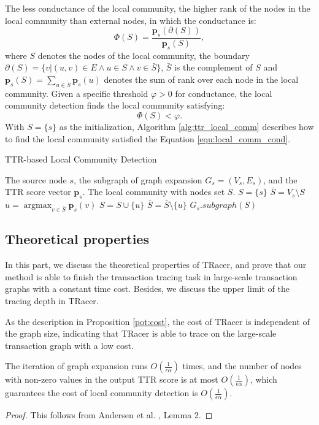 The less conductance \cite{andersen2006local, andersen2007local} of the local community, the higher rank of the nodes in the local community than external nodes, in which the conductance is:
\begin{equation}
    \Phi(S)=\frac{\bm{p}_s(\partial(S))}{\bm{p}_s(S)},
\end{equation}
where $S$ denotes the nodes of the local community, the boundary $\partial(S)=\{ v| (u,v) \in E \land u \in S \land v \in \bar{S} \}$, $\bar{S}$ is the complement of $S$ and $\bm{p}_s(S)=\sum_{u \in S}\bm{p}_s(u)$ denotes the sum of rank over each node in the local community.
Given a specific threshold $\varphi > 0$ for conductance, the local community detection finds the local community satisfying:
\begin{equation}
    \Phi(S) < \varphi.
    \label{equ:local_comm_cond}
\end{equation}
With $S=\{s\}$ as the initialization, Algorithm \ref{alg:ttr_local_comm} describes how to find the local community satisfied the Equation \ref{equ:local_comm_cond}.
\begin{algorithm}[t]
    \caption{TTR-based Local Community Detection}
    \label{alg:ttr_local_comm}
    \begin{algorithmic}[1]
        \REQUIRE The source node $s$, the subgraph of graph expansion $G_s=(V_s, E_s)$, and the TTR score vector $\bm{p}_s$.
        \ENSURE The local community with nodes set $S$.
        \STATE $S = \{ s \}$
        \STATE $\bar{S} = V_s \setminus S$
            \STATE $u =\mathop{\arg\max}_{v\in\bar{S}}\bm{p}_s(v)$
            \STATE $S = S \cup \{ u \}$
            \STATE $\bar{S} = \bar{S} \setminus \{ u \}$
        \ENDWHILE
        \RETURN $G_s.subgraph(S)$
    \end{algorithmic}
\end{algorithm}
\subsection{Theoretical properties}
In this part, we discuss the theoretical properties of TRacer, and prove that our method is able to finish the transaction tracing task in large-scale transaction graphs with a constant time cost. Besides, we discuss the upper limit of the tracing depth in TRacer.

As the description in Proposition \ref{pot:cost}, the cost of TRacer is independent of the graph size, indicating that TRacer is able to trace on the large-scale transaction graph with a low cost.
\begin{proposition}
\label{pot:cost}
The iteration of graph expansion runs $O(\frac{1}{\epsilon \alpha})$ times, and the number of nodes with non-zero values in the output TTR score is at most $O(\frac{1}{\epsilon \alpha})$, which guarantees the cost of local community detection is $O(\frac{1}{\epsilon \alpha})$.
\end{proposition}
\begin{proof}
This follows from Andersen et al. \cite{andersen2006local}, Lemma 2.
\end{proof}


